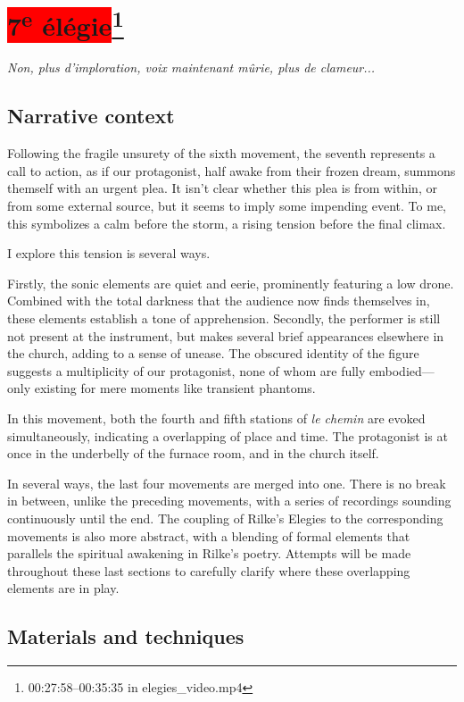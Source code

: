 \documentclass[12pt,twoside,maitrise]{dms_ks}
\theoremstyle{definition}
\begin{document}
{{\section{\colorbox{red}{7\textsuperscript{e} élégie}\footnote{00:27:58--00:35:35 in elegies\_video.mp4}}

\epigraph{\textit{Non, plus d’imploration, voix maintenant mûrie, plus de clameur...}}{}

\subsection{Narrative context}

Following the fragile unsurety of the sixth movement, the seventh represents a call to action, as if our protagonist, half awake from their frozen dream, summons themself with an urgent plea. 
It isn’t clear whether this plea is from within, or from some external source, but it seems to imply some impending event. 
To me, this symbolizes a calm before the storm, a rising tension before the final climax. 

I explore this tension is several ways. 

Firstly, the sonic elements are quiet and eerie, prominently featuring a low drone. 
Combined with the total darkness that the audience now finds themselves in, these elements establish a tone of apprehension.
Secondly, the performer is still not present at the instrument, but makes several brief appearances elsewhere in the church, adding to a sense of unease. 
The obscured identity of the figure suggests a multiplicity of our protagonist, none of whom are fully embodied---only existing for mere moments like transient phantoms.

In this movement, both the fourth and fifth stations of \textit{le chemin} are evoked simultaneously, indicating a overlapping of place and time. 
The protagonist is at once in the underbelly of the furnace room, and in the church itself. 

In several ways, the last four movements are merged into one. 
There is no break in between, unlike the preceding movements, with a series of recordings sounding continuously until the end. 
The coupling of Rilke's Elegies to the corresponding movements is also more abstract, with a blending of formal elements that parallels the spiritual awakening in Rilke’s poetry. 
Attempts will be made throughout these last sections to carefully clarify where these overlapping elements are in play.

\subsection{Materials and techniques}

}}
\end{document}
